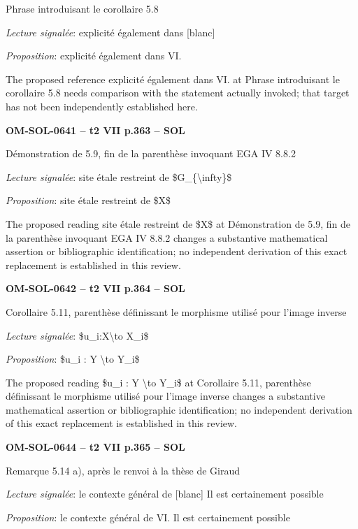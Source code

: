 Phrase introduisant le corollaire 5.8\par
\emph{Lecture signalée}: explicité également dans [blanc]\par
\emph{Proposition}: explicité également dans VI.\par
The proposed reference explicité également dans VI. at Phrase introduisant le corollaire 5.8 needs comparison with the statement actually invoked; that target has not been independently established here.\par
\par\noindent\textbf{OM-SOL-0641 -- t2 VII p.363 -- SOL}\par
Démonstration de 5.9, fin de la parenthèse invoquant EGA IV 8.8.2\par
\emph{Lecture signalée}: site étale restreint de \$G\_\{\textbackslash{}infty\}\$\par
\emph{Proposition}: site étale restreint de \$X\$\par
The proposed reading site étale restreint de \$X\$ at Démonstration de 5.9, fin de la parenthèse invoquant EGA IV 8.8.2 changes a substantive mathematical assertion or bibliographic identification; no independent derivation of this exact replacement is established in this review.\par
\par\noindent\textbf{OM-SOL-0642 -- t2 VII p.364 -- SOL}\par
Corollaire 5.11, parenthèse définissant le morphisme utilisé pour l'image inverse\par
\emph{Lecture signalée}: \$u\_i:X\textbackslash{}to X\_i\$\par
\emph{Proposition}: \$u\_i : Y \textbackslash{}to Y\_i\$\par
The proposed reading \$u\_i : Y \textbackslash{}to Y\_i\$ at Corollaire 5.11, parenthèse définissant le morphisme utilisé pour l'image inverse changes a substantive mathematical assertion or bibliographic identification; no independent derivation of this exact replacement is established in this review.\par
\par\noindent\textbf{OM-SOL-0644 -- t2 VII p.365 -- SOL}\par
Remarque 5.14 a), après le renvoi à la thèse de Giraud\par
\emph{Lecture signalée}: le contexte général de [blanc] Il est certainement possible\par
\emph{Proposition}: le contexte général de VI. Il est certainement possible\par
